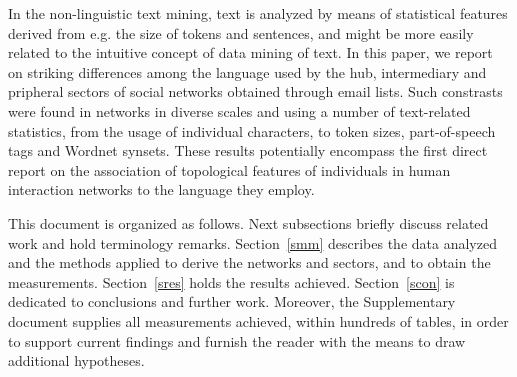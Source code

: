 \documentclass[review]{elsarticle}
\begin{document}
In the non-linguistic text mining, text is analyzed by means of statistical features
derived from e.g. the size of tokens and sentences,
and might be more easily related to the intuitive concept of data mining of text.
In this paper, we report on striking differences among the language used by the hub, intermediary and pripheral sectors of
social networks obtained through email lists.
Such constrasts were found in networks in diverse scales and using a number of text-related statistics,
from the usage of individual characters, to token sizes, part-of-speech tags and Wordnet synsets.
These results potentially encompass the first direct report on the association of topological features
of individuals in human interaction networks to the language they employ.

This document is organized as follows.
Next subsections briefly discuss related work and hold terminology remarks.
Section~\ref{smm} describes the data analyzed and the methods applied to
derive the networks and sectors, and to obtain the measurements.
Section~\ref{sres} holds the results achieved.
Section~\ref{scon} is dedicated to conclusions and further work.
Moreover, the Supplementary document supplies all measurements achieved,
within hundreds of tables, in order to support current findings and furnish
the reader with the means to draw additional hypotheses.
\end{document}
